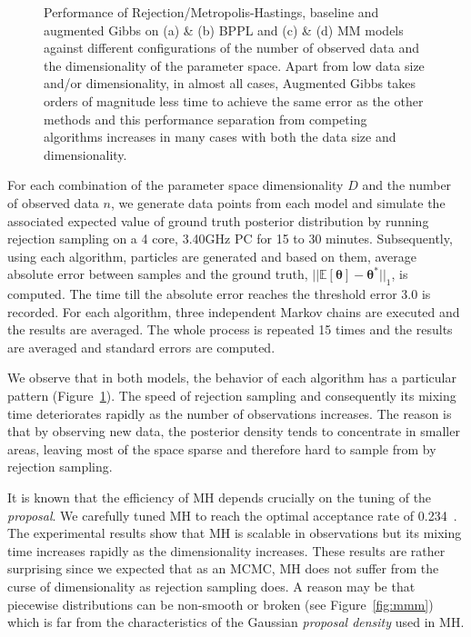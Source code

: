 \documentclass[letterpaper]{article}
\begin{document}
\begin{figure}[tb!]
\vspace{-1mm}
\caption{\footnotesize Performance of Rejection/Metropolis-Hastings, baseline and augmented Gibbs on (a) \& (b) BPPL and (c) \& (d) MM models against different configurations of the number of observed data and the dimensionality of the parameter space.  Apart from low data size and/or dimensionality, in almost all cases, Augmented Gibbs takes orders of magnitude less time to achieve the same error as the other methods and this performance separation from competing algorithms increases in many cases with both the data size and dimensionality.}
\label{fig:results}
\vspace{-3mm}
\end{figure}

For each combination of the parameter space dimensionality $D$ and the number 
of observed data $n$, we generate data points from each model and simulate the 
associated expected value of ground truth posterior distribution by running 
rejection sampling on a 4 core, 3.40GHz PC for 15 to 30 minutes.
Subsequently, using each algorithm, particles are generated and based on them, 
average absolute error between samples and the ground truth, $||\mathbb{E}[\boldsymbol\theta] - \boldsymbol\theta^*||_1$, is computed. 
The time till the absolute error reaches the threshold error 3.0 is recorded.
For each algorithm, three independent Markov chains are executed and the results are averaged.
The whole process is repeated 15 times and the results are averaged and standard errors are computed. 

We observe that
in both models, the behavior of each algorithm has a particular pattern 
(Figure~\ref{fig:results}). 
The speed of rejection sampling and consequently its mixing time deteriorates rapidly as the number of observations increases.%
The reason is that by observing new data, the posterior density tends to concentrate in smaller areas, 
leaving most of the space sparse and therefore hard to sample from by rejection sampling.

It is known that the efficiency of MH depends crucially on the tuning
of the \emph{proposal}.  We carefully tuned MH to reach the optimal
acceptance rate of 0.234~\cite{Roberts:97}.  The experimental results
show that MH is scalable in observations but its mixing time increases
rapidly as the dimensionality increases.  These results are rather
surprising since we expected that as an MCMC, MH does not suffer from
the curse of dimensionality as rejection sampling does.  A reason may
be that piecewise distributions can be non-smooth or broken (see
Figure~\ref{fig:mmm}) which is far from the characteristics of the
Gaussian \emph{proposal density} used in MH.
\end{document}
